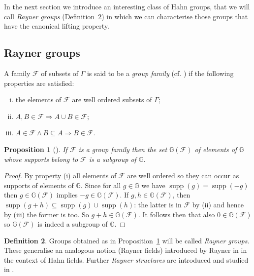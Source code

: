\documentclass[12pt,a4paper,reqno,openright]{amsart}
\newcommand{\bbG}{{\mathbb G}}
\newcommand{\cF}{{\mathcal F}}
\newcommand{\Ra}{\Rightarrow}
\renewcommand{\1}{\mathbbm{1}}
\newcommand{\GG}{\bbG}
\DeclareMathOperator*\supp{supp}
\theoremstyle{definition}
\newtheorem{defn}{Definition}[section]
\theoremstyle{plain}
\theoremstyle{plain}
\theoremstyle{plain}
\newtheorem{prop}[defn]{Proposition}
\theoremstyle{plain}
\theoremstyle{plain}
\theoremstyle{plain}
\theoremstyle{plain}
\theoremstyle{plain}
\theoremstyle{definition}
\theoremstyle{definition}
\theoremstyle{plain}
\theoremstyle{definition}
\theoremstyle{definition}
\theoremstyle{plain}
\theoremstyle{plain}
\theoremstyle{plain}
\begin{document}
In the next section we introduce an interesting class of Hahn groups, that we will call \emph{Rayner groups} (Definition~\ref{def:rayner-group}) in which we can characterise those groups that have the canonical lifting property.


\subsection{Rayner groups}\label{sec:rayner-groups}
A family $ \cF $ of subsets of $ \Gamma $
is said to be a \emph{group family} 
(cf. \cite[Paragraph 2]{rayner1968})
if the following properties are satisfied:
\begin{enumerate}[(i)]
	\item the elements of $ \cF $ are well ordered subsets of $ \Gamma $;
	\item $ A,B\in\cF \Ra A\cup B\in\cF $;
	\item $ A\in\cF\wedge B\subseteq A \Ra B\in\cF $.
\end{enumerate}
\begin{prop}[{\cite[Theorem~1]{rayner1968}}]\label{prop:rayner-family-yield-groups}
	If $ \cF $ is a group family then the set $ \GG(\cF) $ of elements of $ \GG $ whose supports belong to $ \cF $ is a subgroup of $ \GG $.
\end{prop}
\begin{proof}
	By property (i) all elements of $ \cF $ are well ordered so they can occur as supports of elements of $ \GG $. Since for all $ g\in \GG $ we have $ \supp(g) = \supp(-g) $ then $ g\in\GG(\cF) $ implies $ -g\in\GG(\cF) $. If $ g,h\in\GG(\cF) $, then $ \supp(g+h)\subseteq \supp(g) \cup \supp(h) $: the latter is in $ \cF $ by (ii) and hence by (iii) the former is too. So $ g+h\in\GG(\cF) $. It follows then that also $ 0\in\GG(\cF) $ so $ \GG(\cF) $ is indeed a subgroup of $ \GG $.
\end{proof}
\begin{defn}\label{def:rayner-group}
	Groups obtained as in Proposition~\ref{prop:rayner-family-yield-groups} will be called \emph{Rayner groups}. These generalise an analogous notion (Rayner fields) introduced by Rayner in \cite{rayner1968} in the context of Hahn fields. Further \emph{Rayner structures} are introduced and studied in \cite{KKS-rayner-structures}.
\end{defn}
\end{document}
